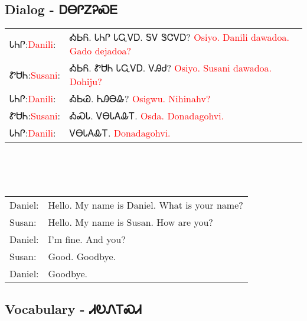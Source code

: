 \newpage\subsection{Dialog - ᎠᎾᎵᏃᎮᏍᎬ}
\begin{tabular}{p{2cm} p{11cm}}
ᏓᏂᎵ:\newline \textcolor{red}{Danili}: & ᎣᏏᏲ.  ᏓᏂᎵ ᏓᏩᏙᎠ.  ᎦᏙ ᏕᏣᏙᎠ? 
\newline\textcolor{red}{Osiyo.  Danili dawadoa.  Gado dejadoa?}\\
ᏑᏌᏂ:\newline \textcolor{red}{Susani}: & ᎣᏏᏲ.  ᏑᏌᏂ ᏓᏩᏙᎠ.  ᏙᎯᏧ? 
\newline\textcolor{red}{Osiyo.  Susani dawadoa.  Dohiju?}\\
ᏓᏂᎵ:\newline \textcolor{red}{Danili}: & ᎣᏏᏊ.  ᏂᎯᎾᎲ? 
\newline\textcolor{red}{Osigwu.  Nihinahv?}\\
ᏑᏌᏂ:\newline \textcolor{red}{Susani}: & ᎣᏍᏓ.  ᏙᎾᏓᎪᎲᎢ. 
\newline\textcolor{red}{Osda.  Donadagohvi.}\\
ᏓᏂᎵ:\newline \textcolor{red}{Danili}: & ᏙᎾᏓᎪᎲᎢ. 
\newline\textcolor{red}{Donadagohvi.}\\
\end{tabular}
\\
\\
\\
\noindent\begin{tabular}{p{2cm} p{11cm}}Daniel: & Hello.  My name is Daniel.  What is your name?\\
Susan: & Hello.  My name is Susan.  How are you?\\
Daniel: & I'm fine.  And you?\\
Susan: & Good.  Goodbye.\\
Daniel: & Goodbye.\\
\end{tabular}
\vfill\newpage\subsection{Vocabulary - ᏗᎧᏁᎢᏍᏗ 
}
